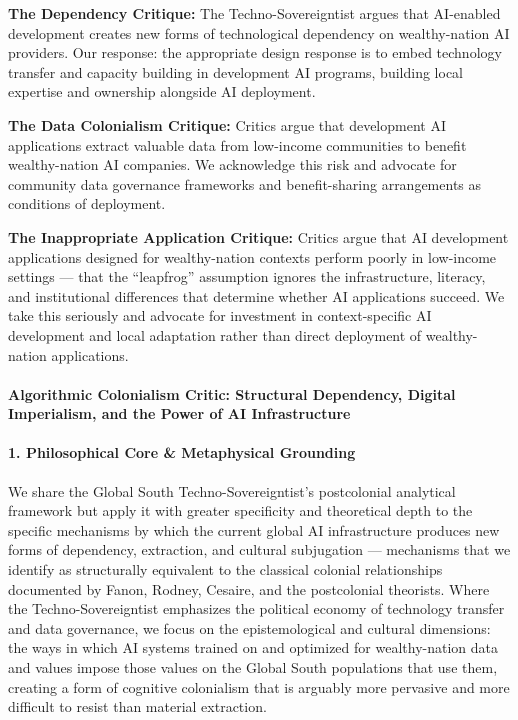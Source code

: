 \textbf{The Dependency Critique:} The Techno-Sovereigntist argues that
AI-enabled development creates new forms of technological dependency on
wealthy-nation AI providers. Our response: the appropriate design
response is to embed technology transfer and capacity building in
development AI programs, building local expertise and ownership
alongside AI deployment.

\textbf{The Data Colonialism Critique:} Critics argue that development
AI applications extract valuable data from low-income communities to
benefit wealthy-nation AI companies. We acknowledge this risk and
advocate for community data governance frameworks and benefit-sharing
arrangements as conditions of deployment.

\textbf{The Inappropriate Application Critique:} Critics argue that AI
development applications designed for wealthy-nation contexts perform
poorly in low-income settings --- that the ``leapfrog'' assumption
ignores the infrastructure, literacy, and institutional differences that
determine whether AI applications succeed. We take this seriously and
advocate for investment in context-specific AI development and local
adaptation rather than direct deployment of wealthy-nation applications.

\paragraph{Algorithmic Colonialism Critic: Structural Dependency,
Digital Imperialism, and the Power of AI
Infrastructure}\label{algorithmic-colonialism-critic-structural-dependency-digital-imperialism-and-the-power-of-ai-infrastructure}

\paragraph{1. Philosophical Core \& Metaphysical
Grounding}\label{philosophical-core-metaphysical-grounding-47}

We share the Global South Techno-Sovereigntist's postcolonial analytical
framework but apply it with greater specificity and theoretical depth to
the specific mechanisms by which the current global AI infrastructure
produces new forms of dependency, extraction, and cultural subjugation
--- mechanisms that we identify as structurally equivalent to the
classical colonial relationships documented by Fanon, Rodney, Cesaire,
and the postcolonial theorists. Where the Techno-Sovereigntist
emphasizes the political economy of technology transfer and data
governance, we focus on the epistemological and cultural dimensions: the
ways in which AI systems trained on and optimized for wealthy-nation
data and values impose those values on the Global South populations that
use them, creating a form of cognitive colonialism that is arguably more
pervasive and more difficult to resist than material extraction.

